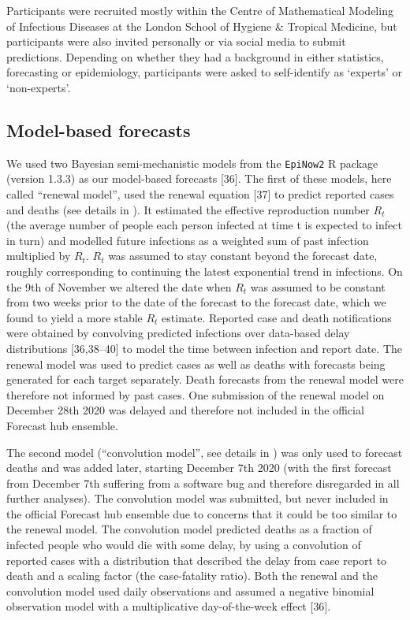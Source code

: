 \documentclass[10pt,letterpaper]{article}
\begin{document}
Participants were recruited mostly within the Centre of Mathematical
Modeling of Infectious Diseases at the London School of Hygiene \&
Tropical Medicine, but participants were also invited personally or via
social media to submit predictions. Depending on whether they had a
background in either statistics, forecasting or epidemiology,
participants were asked to self-identify as `experts' or `non-experts'.

\hypertarget{model-based-forecasts}{%
\subsection{Model-based forecasts}\label{model-based-forecasts}}

We used two Bayesian semi-mechanistic models from the \texttt{EpiNow2} R
package (version 1.3.3) as our model-based forecasts {[}36{]}. The first
of these models, here called ``renewal model'', used the renewal
equation {[}37{]} to predict reported cases and deaths (see details in
). It estimated the effective reproduction
number \(R_t\) (the average number of people each person infected at
time t is expected to infect in turn) and modelled future infections as
a weighted sum of past infection multiplied by \(R_t\). \(R_t\) was
assumed to stay constant beyond the forecast date, roughly corresponding
to continuing the latest exponential trend in infections. On the 9th of
November we altered the date when \(R_t\) was assumed to be constant
from two weeks prior to the date of the forecast to the forecast date,
which we found to yield a more stable \(R_t\) estimate. Reported case
and death notifications were obtained by convolving predicted infections
over data-based delay distributions {[}36,38--40{]} to model the time
between infection and report date. The renewal model was used to predict
cases as well as deaths with forecasts being generated for each target
separately. Death forecasts from the renewal model were therefore not
informed by past cases. One submission of the renewal model on December
28th 2020 was delayed and therefore not included in the official
Forecast hub ensemble.

The second model (``convolution model'', see details in
) was only used to forecast deaths and was
added later, starting December 7th 2020 (with the first forecast from
December 7th suffering from a software bug and therefore disregarded in
all further analyses). The convolution model was submitted, but never
included in the official Forecast hub ensemble due to concerns that it
could be too similar to the renewal model. The convolution model
predicted deaths as a fraction of infected people who would die with
some delay, by using a convolution of reported cases with a distribution
that described the delay from case report to death and a scaling factor
(the case-fatality ratio). Both the renewal and the convolution model
used daily observations and assumed a negative binomial observation
model with a multiplicative day-of-the-week effect {[}36{]}.
\end{document}
